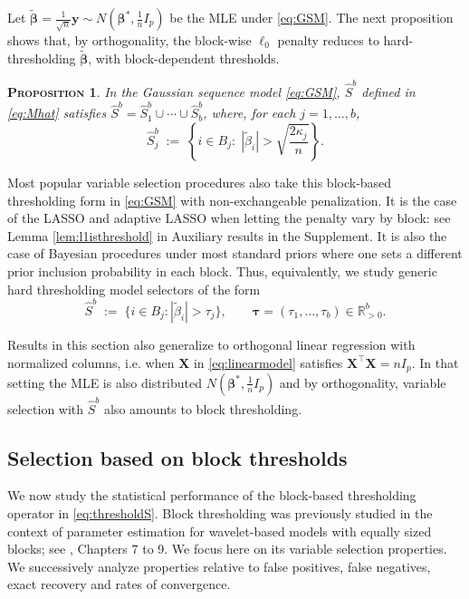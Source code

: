 \documentclass[aos]{imsart}
\theoremstyle{plain}
\newtheorem{prop}[thm]{\textsc{Proposition}}
\newcommand{\R}{\mathbb{R}}
\newcommand{\bs}{\boldsymbol}
\begin{document}
Let $\tilde{\bs \beta}=\frac{1}{\sqrt{n}}\bs y \sim N(\bs \beta^*,\tfrac{1}{n}I_p)$ be the MLE under \eqref{eq:GSM}. The next proposition shows that, by orthogonality, the block-wise $\ell_0$ penalty reduces to hard-thresholding $\tilde{\bs \beta}$, with block-dependent thresholds.
\begin{prop}\label{prop:isthresh}
	In the Gaussian sequence model \eqref{eq:GSM}, $\hat{S}^b$ defined in \eqref{eq:Mhat} satisfies $\hat S^b=\hat S^b_1\cup \cdots \cup \hat S^b_b$, where, for each $j=1,\ldots,b$,
	$$
	\hat S_j^b\;:=\;\left\{i\in B_j:\; |\tilde{\beta}_i|> \sqrt{\frac{2\kappa_j}{n}}\right\}.
	$$ 
\end{prop}
Most popular variable selection procedures also take this block-based thresholding form in \eqref{eq:GSM} with non-exchangeable penalization. It is the case of the LASSO and adaptive LASSO when letting the penalty vary by block: see Lemma \ref{lem:l1isthreshold} in Auxiliary results in the Supplement. It is also the case of Bayesian procedures under most standard priors \citep{davidomiros} where one sets a different prior inclusion probability in each block. Thus, equivalently, we study generic hard thresholding model selectors of the form
\begin{equation}\label{eq:thresholdS}
\hat S^{b}\;:=\;\{i\in B_j: |\tilde{\beta}_i|>\tau_j\}, \qquad\bs \tau=(\tau_1,\ldots,\tau_b)\in \R^b_{>0}.	
\end{equation}

Results in this section also generalize to orthogonal linear regression with normalized columns, i.e. when $\bs X$ in \eqref{eq:linearmodel} satisfies $\bs X^\top \bs X=n I_p$. In that setting the MLE is also distributed $N(\bs \beta^*,\tfrac{1}{n}I_p)$ and by orthogonality, variable selection with $\hat{S}^b$ also amounts to block thresholding.

\subsection{Selection based on block thresholds}
\label{ssec:block_thresholds}


We now study the statistical performance of the block-based thresholding operator in \eqref{eq:thresholdS}. Block thresholding was previously studied in the context of parameter estimation for wavelet-based models with equally sized blocks; see \cite{johnstone}, Chapters 7 to 9.
We focus here on its variable selection properties. We successively analyze properties relative to false positives, false negatives, exact recovery and rates of convergence. 
\medskip
\end{document}
